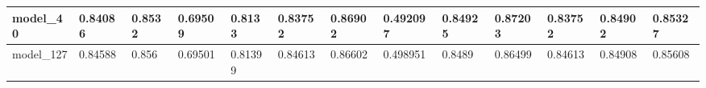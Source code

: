 \begin{tabular}{|l|l|l|l|l|l|l|l|l|l|l|l|l|}
model\_40      & 0.84086     & 0.8532         & 0.69509      & 0.8133           & 0.83752              & 0.86902              & 0.492097     & 0.84925           & 0.87203            & 0.83752         & 0.84902     & 0.85327      \\ \hline
model\_127     & 0.84588     & 0.856          & 0.69501      & 0.81399          & 0.84613              & 0.86602              & 0.498951     & 0.8489            & 0.86499            & 0.84613         & 0.84908     & 0.85608      \\ \hline
\end{tabular}